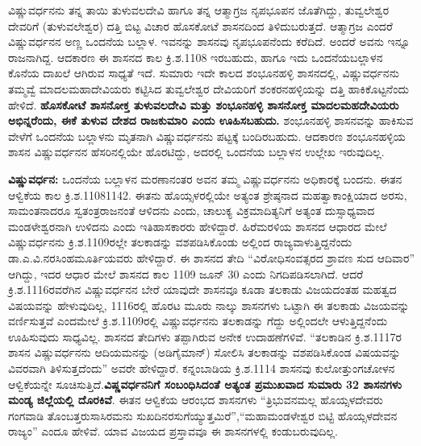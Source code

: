 ವಿಷ್ಣುವರ್ಧನನು ತನ್ನ ತಾಯಿ ತುಳುವಲದೇವಿ ಹಾಗೂ ತನ್ನ ಆತ್ಮಾಗ್ರಜ ನೃಪಭೂಪನ ಜೊತೆಗಿದ್ದು, ತುವ್ವಲೇಶ್ವರ ದೇವರಿಗೆ (ತುಳುವಲೇಶ್ವರ) ದತ್ತಿ ಬಿಟ್ಟ ವಿಚಾರ ಹೊಸಕೋಟೆ ಶಾಸನದಿಂದ ತಿಳಿದುಬರುತ್ತದೆ. ಆತ್ಮಾಗ್ರಜ ಎಂದರೆ ವಿಷ್ಣುವರ್ಧನನ ಅಣ್ಣ ಒಂದನೆಯ ಬಲ್ಲಾಳ. ಇವನನ್ನು ಶಾಸನವು ನೃಪಭೂಪನೆಂದು ಕರೆದಿದೆ. ಅಂದರೆ ಅವನು ಇನ್ನೂ ರಾಜನಾಗಿದ್ದ. ಆದಕಾರಣ ಈ ಶಾಸನದ ಕಾಲ ಕ್ರಿ.ಶ.1108 ಇರಬಹುದು, ಹಾಗೂ ಇದು ಒಂದನೆಯಬಲ್ಲಾಳನ ಕೊನೆಯ ದಾಖಲೆ ಆಗಿರುವ ಸಾಧ್ಯತೆ ಇದೆ. ಸುಮಾರು ಇದೇ ಕಾಲದ ಶಂಭೂನಹಳ್ಳಿ ಶಾಸನದಲ್ಲಿ, ವಿಷ್ಣುವರ್ಧನನು ತಮ್ಮವ್ವೆ ಮಾದಲಮಹಾದೇವಿಯರು ಕಟ್ಟಿಸಿದ ತುವ್ವಲೇಶ್ವರ ದೇವಿಯರಿಗೆ ಶಂಕರನಹಳ್ಳಿಯನ್ನು ದತ್ತಿ ಹಾಕಿಕೊಟ್ಟನೆಂದು ಹೇಳಿದೆ. \textbf{ಹೊಸಕೋಟೆ ಶಾಸನೋಕ್ತ ತುಳುವಲದೇವಿ ಮತ್ತು ಶಂಭೂನಹಳ್ಳಿ ಶಾಸನೋಕ್ತ ಮಾದಲಮಹದೇವಿಯರು ಅಭಿನ್ನರೆಂದು, ಈಕೆ ತುಳುವ ದೇಶದ ರಾಜಕುಮಾರಿ ಎಂದು ಊಹಿಸಬಹುದು.} ಶಂಭೂನಹಳ್ಳಿ ಶಾಸನವನ್ನು ಹಾಕಿಸುವ ವೇಳೆಗೆ ಒಂದನೆಯ ಬಲ್ಲಾಳನು ಮೃತನಾಗಿ ವಿಷ್ಣುವರ್ಧನನು ಪಟ್ಟಕ್ಕೆ ಬಂದಿರಬಹುದು. ಆದಕಾರಣ ಶಂಭೂನಹಳ್ಳಿಯ ಶಾಸನ ವಿಷ್ಣುವರ್ಧನನ ಹೆಸರಿನಲ್ಲಿಯೇ ಹೊರಟಿದ್ದು, ಅದರಲ್ಲಿ ಒಂದನೆಯ ಬಲ್ಲಾಳನ ಉಲ್ಲೇಖ ಇರುವುದಿಲ್ಲ.

\textbf{ವಿಷ್ಣುವರ್ಧನ:} ಒಂದನೆಯ ಬಲ್ಲಾಳನ ಮರಣಾನಂತರ ಅವನ ತಮ್ಮ ವಿಷ್ಣುವರ್ಧನನು ಅಧಿಕಾರಕ್ಕೆ ಬಂದನು. ಈತನ ಆಳ್ವಿಕೆಯ ಕಾಲ ಕ್ರಿ.ಶ.11081142. ಈತನು ಹೊಯ್ಸಳರಲ್ಲಿಯೇ ಅತ್ಯಂತ ಶ್ರೇಷ್ಠನಾದ ಮಹತ್ವಾಕಾಂಕ್ಷಿಯಾದ ಅರಸು, ಸಾಮಂತನಾದರೂ ಸ್ವತಂತ್ರರಾಜನಂತೆ ಆಳಿದನು ಎಂದು, ಚಾಲುಕ್ಯ ವಿಕ್ರಮಾದಿತ್ಯನಿಗೆ ಅತ್ಯಂತ ದುಸ್ಸಾಧ್ಯವಾದ ಮಂಡಳೇಶ್ವರನಾಗಿ ಉಳಿದನು ಎಂದು ಇತಿಹಾಸಕಾರರು ಹೇಳಿದ್ದಾರೆ. ಹಿರೆಮರಳಿಯ ಶಾಸನದ ಆಧಾರದ ಮೇಲೆ ವಿಷ್ಣುವರ್ಧನನು ಕ್ರಿ.ಶ.1109ರಲ್ಲೇ ತಲಕಾಡನ್ನು ವಶಪಡಿಸಿಕೊಂಡು ಅಲ್ಲಿಂದ ರಾಜ್ಯವಾಳುತ್ತಿದ್ದನೆಂದು ಡಾ.ಎ.ವಿ.ನರಸಿಂಹಮೂರ್ತಿಯವರು ಹೇಳಿದ್ದಾರೆ. ಈ ಶಾಸನದ ತೇದಿ “ವಿರೋಧಿಸಂವತ್ಸರದ ಶ್ರಾವಣ ಸುದ ಆದಿವಾರ” ಆಗಿದ್ದು, ಇದರ ಆಧಾರ ಮೇಲೆ ಶಾಸನದ ಕಾಲ 1109 ಜೂನ್​ 30 ಎಂದು ನಿಗದಿಪಡಿಸಲಾಗಿದೆ. ಆದರೆ ಕ್ರಿ.ಶ.1116ರವರೆಗಿನ ವಿಷ್ಣುವರ್ಧನನ ಬೇರೆ ಯಾವುದೇ ಶಾಸನವೂ ಕೂಡಾ ತಲಕಾಡು ವಿಜಯದಂತಹ ಮಹತ್ವದ ವಿಷಯವನ್ನು ಹೇಳುವುದಿಲ್ಲ, 1116ರಲ್ಲಿ ಹೊರಟ ಮೂರು ನಾಲ್ಕು ಶಾಸನಗಳು ಒಟ್ಟಾಗಿ ಈ ತಲಕಾಡು ವಿಜಯವನ್ನು ವರ್ಣಿಸುತ್ತವೆ ಎಂದಮೇಲೆ ಕ್ರಿ.ಶ.1109ರಲ್ಲಿ ವಿಷ್ಣುವರ್ಧನನು ತಲಕಾಡನ್ನು ಗೆದ್ದು ಅಲ್ಲಿಂದಲೇ ಆಳುತ್ತಿದ್ದನೆಂದು ಊಹಿಸುವುದು ಸಾಧ್ಯವಿಲ್ಲ. ಶಾಸನದ ತೇದಿಗಳು ತಪ್ಪಾಗಿರುವ ಅನೇಕ ಉದಾಹಣೆಗಳಿವೆ. “ತಲಕಾಡಿನ ಕ್ರಿ.ಶ.1117ರ ಶಾಸನ ವಿಷ್ಣುವರ್ಧನನು ಆದಿಯಮನನ್ನು (ಅಡಿಗೈಮಾನ್​) ಸೋಲಿಸಿ ತಲಕಾಡನ್ನು ವಶಪಡಿಸಿಕೊಂಡ ವಿಷಯವನ್ನು ವಿವರವಾಗಿ ತಿಳಿಸುತ್ತದೆಂದು” ಅವರೇ ಹೇಳಿದ್ದಾರೆ. ಕನ್ನಂಬಾಡಿಯ ಕ್ರಿ.ಶ.1114 ಶಾಸನವು ಕುಲೋತ್ತುಂಗಚೋಳನ ಆಳ್ವಿಕೆಯನ್ನೇ ಸೂಚಿಸುತ್ತಿದೆ.\textbf{ವಿಷ್ಣವರ್ಧನನಿಗೆ ಸಂಬಂಧಿಸಿದಂತೆ ಅತ್ಯಂತ ಪ್ರಮುಖವಾದ ಸುಮಾರು 32 ಶಾಸನಗಳು ಮಂಡ್ಯ ಜಿಲ್ಲೆಯಲ್ಲಿ ದೊರಕಿವೆ}. ಈತನ ಆಳ್ವಿಕೆಯ ಆರಂಭದ ಶಾಸನಗಳು “ತ್ರಿಭುವನಮಲ್ಲ ಹೊಯ್ಸಳದೇವರು ಗಂಗವಾಡಿ ತೊಂಬತ್ತರುಸಾಸಿರಮನು ಸುಖದಿನರಸುಗೆಯ್ಯುತ್ತಮಿರೆ”,\break “ಮಹಾಮಂಡಳೇಶ್ವರ ಬಿಟ್ಟಿ ಹೊಯ್ಸಳದೇವನ ರಾಜ್ಯಂ” ಎಂದೂ ಹೇಳಿವೆ. ಯಾವ ವಿಜಯದ ಪ್ರಸ್ತಾವವೂ ಈ ಶಾಸನಗಳಲ್ಲಿ ಕಂಡುಬರುವುದಿಲ್ಲ. 

